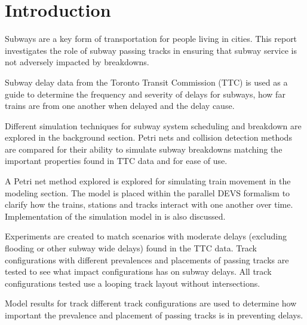 \section{Introduction}

Subways are a key form of transportation for people living in cities. This
report investigates the role of subway passing tracks in ensuring that subway
service is not adversely impacted by breakdowns.

Subway delay data from the Toronto Transit Commission (TTC) is used as a guide
to determine the frequency and severity of delays for subways, how far trains
are from one another when delayed and the delay cause.

Different simulation techniques for subway system scheduling and breakdown are
explored in the background section. Petri nets and collision detection methods
are compared for their ability to simulate subway breakdowns matching the
important properties found in TTC data and for ease of use. 

A Petri net method explored is explored for simulating train movement in the
modeling section. The model is placed within the parallel DEVS formalism to
clarify how the trains, stations and tracks interact with one another over time.
Implementation of the simulation model in  is also discussed.

Experiments are created to match scenarios with moderate delays (excluding
flooding or other subway wide delays) found in the TTC data. Track
configurations with different prevalences and placements of passing tracks are
tested to see what impact configurations has on subway delays. All track
configurations tested use a looping track layout without intersections.

Model results for track different track configurations are used to determine how
important the prevalence and placement of passing tracks is in preventing
delays. 
